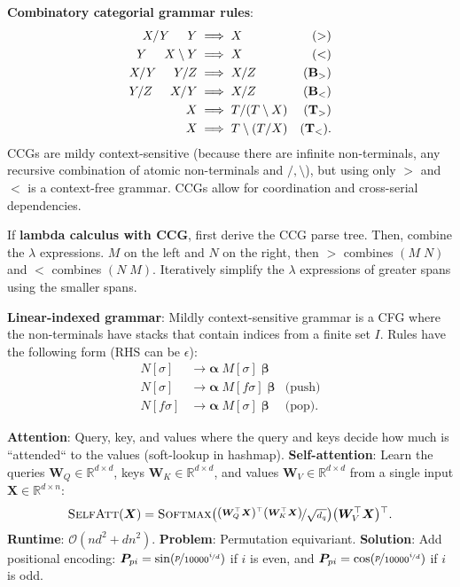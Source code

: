 \documentclass{article}
\def\softmax{\textsc{Softmax}}
\newcommand{\lft}{\mathopen{}\left}
\newcommand{\rgt}{\aftergroup\mathclose\aftergroup{\aftergroup}\right}
\newenvironment{topic}[1]
{\begin{tcolorbox}[
  title=#1,
  breakable,
  colback=white,
  colframe=black,
  fonttitle={\bfseries\sffamily},
  sharp corners,
  boxrule=0.5pt,
  boxsep=0.1cm,
  top=0cm,
  bottom=0cm,
  left=0.1cm,
  right=0.1cm,
  enhanced jigsaw,
]}
{\end{tcolorbox}}
\begin{document}
\begin{multicols}{3}
\begin{topic}{Semantic parsing}
  \textbf{Combinatory categorial grammar rules}:
  \begin{align*}
    X / Y \hspace{0.5cm} Y &\implies X & (>) \\
    Y \hspace{0.5cm} X \setminus Y &\implies X & (<) \\
    X / Y \hspace{0.5cm} Y / Z &\implies X / Z & (\mathbf{B}_>) \\
    Y / Z \hspace{0.5cm} X / Y &\implies X / Z & (\mathbf{B}_<) \\
    X &\implies T / (T \setminus X) & (\mathbf{T}_>) \\
    X &\implies T \setminus (T / X) & (\mathbf{T}_<)
  .\end{align*}
  CCGs are mildy context-sensitive (because there are infinite non-terminals,
  any recursive combination of atomic non-terminals and $/,\setminus$), but
  using only $>$ and $<$ is a context-free grammar. CCGs allow for coordination
  and cross-serial dependencies.

  If \textbf{lambda calculus with CCG}, first derive the CCG parse tree. Then,
  combine the $\lambda$ expressions. $M$ on the left and $N$ on the right, then
  $>$ combines $(M \; N)$ and $<$ combines $(N \; M)$. Iteratively simplify the
  $\lambda$ expressions of greater spans using the smaller spans.

  \textbf{Linear-indexed grammar}: Mildly context-sensitive grammar is a CFG
  where the non-terminals have stacks that contain indices from a finite set
  $I$. Rules have the following form (RHS can be $\epsilon$):
  \begin{align*}
    N[\sigma] &\to \bm{\alpha} \; M[\sigma] \; \bm{\beta} \\
    N[\sigma] &\to \bm{\alpha} \; M[f\sigma] \; \bm{\beta} & \text{(push)} \\
    N[f\sigma] &\to \bm{\alpha} \; M[\sigma] \; \bm{\beta} & \text{(pop)}
  .\end{align*}
\end{topic}

\begin{topic}{Transformers}
  \textbf{Attention}: Query, key, and values where the query and keys decide
  how much is ``attended`` to the values (soft-lookup in hashmap).
  \textbf{Self-attention}: Learn the queries $\bm{W}_Q\in\mathbb{R}^{d\times
  d}$, keys $\bm{W}_K\in\mathbb{R}^{d\times d}$, and values
  $\bm{W}_V\in\mathbb{R}^{d\times d}$ from a single input
  $\bm{X}\in\mathbb{R}^{d\times n}$: \[
    \textsc{SelfAtt}(\bm{X}) = \softmax \lft( \nicefrac{\lft( \bm{W}_Q^\top \bm{X} \rgt)^\top \lft( \bm{W}_K^\top \bm{X} \rgt)}{\sqrt{d_q}} \rgt) \lft( \bm{W}_V^\top \bm{X} \rgt)^\top
  .\]
  \textbf{Runtime}: $\mathcal{O}(nd^2 + dn^2)$. \textbf{Problem}: Permutation
  equivariant. \textbf{Solution}: Add positional encoding: $\bm{P}_{pi}=\sin(
  \nicefrac{p}{10000^{\nicefrac{i}{d}}} )$ if $i$ is even, and
  $\bm{P}_{pi}=\cos( \nicefrac{p}{10000^{\nicefrac{i}{d}}} )$ if $i$ is odd.


\end{topic}
\end{multicols}
\end{document}
